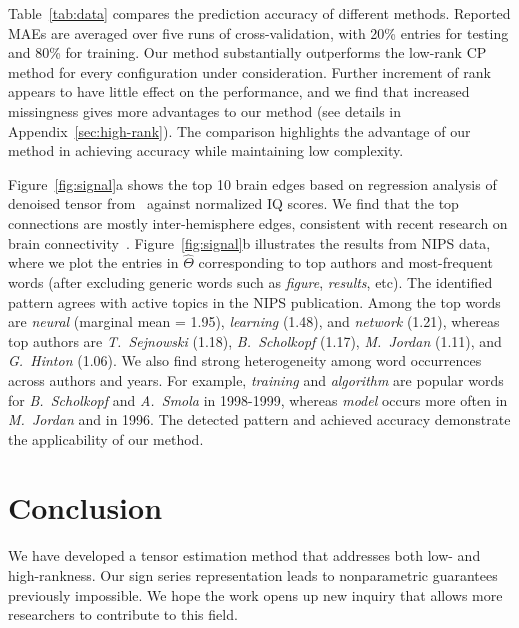 \documentclass{article}
\theoremstyle{plain}
\theoremstyle{definition}
\def\NonParaT{\text{\bf \footnotesize NonparaT}}
\begin{document}
Table~\ref{tab:data} compares the prediction accuracy of different methods. Reported MAEs are averaged over five runs of cross-validation, with 20\% entries for testing and 80\% for training. Our method substantially outperforms the low-rank CP method for every configuration under consideration. Further increment of rank appears to have little effect on the performance, and we find that increased missingness gives more advantages to our method (see details in Appendix~\ref{sec:high-rank}). The comparison highlights the advantage of our method in achieving accuracy while maintaining low complexity. 

Figure~\ref{fig:signal}a shows the top 10 brain edges based on regression analysis of denoised tensor from \NonParaT\ against normalized IQ scores. We find that the top connections are mostly inter-hemisphere edges, consistent with recent research on brain connectivity~\cite{li2009brain,wang2017bayesian}. Figure~\ref{fig:signal}b illustrates the results from NIPS data, where we plot the entries in $\hat \Theta$ corresponding to top authors and most-frequent words (after excluding generic words such as \emph{figure}, \emph{results}, etc). The identified pattern agrees with active topics in the NIPS publication. Among the top words are \emph{neural} (marginal mean = 1.95), \emph{learning} (1.48), and \emph{network} (1.21), whereas top authors are \emph{T.\ Sejnowski} (1.18), \emph{B.~Scholkopf} (1.17), \emph{M.\ Jordan} (1.11), and \emph{G.\ Hinton} (1.06). We also find strong heterogeneity among word occurrences across authors and years. For example, \emph{training} and \emph{algorithm} are popular words for \emph{B.\ Scholkopf} and \emph{A.\ Smola} in 1998-1999, whereas \emph{model} occurs more often in \emph{M.\ Jordan} and in 1996. The detected pattern and achieved accuracy demonstrate the applicability of our method.


\vspace{-.1cm}
\section{Conclusion}
\vspace{-.2cm}
We have developed a tensor estimation method that addresses both low- and high-rankness. Our sign series representation leads to nonparametric guarantees previously impossible. We hope the work opens up new inquiry that allows more researchers to contribute to this field.



\end{document}
